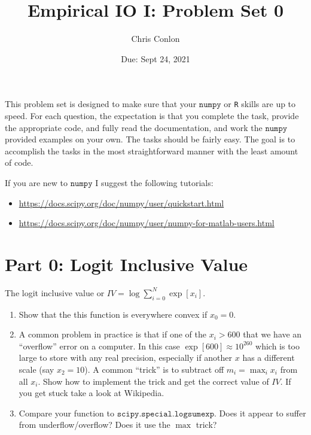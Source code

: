 \documentclass{article}
\begin{document}
\title{Empirical IO I: Problem Set 0} 
\author{Chris Conlon}
\date{Due: Sept 24, 2021}
\maketitle
This problem set is designed to make sure that your $\mathtt{numpy}$ or \texttt{R} skills are up to speed. For each question, the expectation is that you complete the task, provide the appropriate code, and fully read the documentation, and work the $\mathtt{numpy}$ provided examples on your own.  The tasks should be fairly easy.  The goal is to accomplish the tasks in the most straightforward manner with the least amount of code.  

If you are new to $\mathtt{numpy}$ I suggest the following tutorials:
\begin{itemize}
\item \url{https://docs.scipy.org/doc/numpy/user/quickstart.html}
\item  \url{https://docs.scipy.org/doc/numpy/user/numpy-for-matlab-users.html}
\end{itemize}

\section*{Part 0: Logit Inclusive Value}
The logit inclusive value or $IV = \log \sum_{i=0}^N \exp[x_i]$.
\begin{enumerate}
\item Show that the this function is everywhere convex if $x_0=0$.
\item A common problem in practice is that if one of the $x_i > 600$ that we have an ``overflow'' error on a computer. In this case $\exp[600] \approx 10^{260}$ which is too large to store with any real precision, especially if another $x$ has a different scale (say $x_2=10$). A common ``trick'' is to subtract off $m_i = \max_i x_i$ from all $x_i$.  Show how to implement the trick and get the correct value of $IV$. If you get stuck take a look at Wikipedia.
\item Compare your function to $\mathtt{scipy.special.logsumexp}$. Does it appear to suffer from underflow/overflow? Does it use the $\max$ trick?
\end{enumerate}
\end{document}
